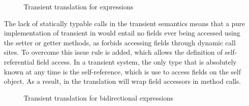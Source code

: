 \documentclass[a4paper,USenglish]{tex/lipics-v2016}
\begin{document}
\begin{figure}
\begin{mathpar}





\end{mathpar}
\caption{Transient translation for expressions}
\label{fig:tratrans_exp}
\end{figure}


The lack of statically typable calls in the transient semantics means that a
pure implementation of transient in  \kafka would entail no fields ever being
accessed using the setter or getter methods, as \kafka forbids accessing fields through
dynamic call sites. To overcome this issue rule  is added, which
allows the definition of self-referential field access. In a transient  system,
the only type that is absolutely known at any time is the self-reference, which
is use to access fields on the  self object. As a result, in \kafka the
translation will wrap field accessors in method calls.

\begin{figure}
\begin{mathpar}

\end{mathpar}
\caption{Transient translation for bidirectional expressions}
\label{fig:tratrans_exp2}
\end{figure}
\end{document}
